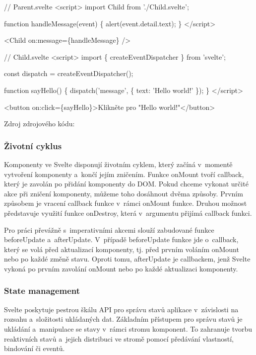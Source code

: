 \begin{prog}
// Parent.svelte
<script>
  import Child from './Child.svelte';

  function handleMessage(event) \{
    alert(event.detail.text);
  \}
</script>

<Child on:message=\{handleMessage\} />

// Child.svelte
<script>
  import \{ createEventDispatcher \} from 'svelte';

  const dispatch = createEventDispatcher();

  function sayHello() \{
    dispatch('message', \{
      text: 'Hello world!'
    \});
  \}
</script>

<button on:click=\{sayHello\}>Klikněte pro "Hello world!"</button>
\end{prog}

Zdroj zdrojového kódu: \cite{svelte}

\subsubsection{Životní cyklus}

Komponenty ve Svelte disponují životním cyklem, který začíná v~momentě vytvoření komponenty a~končí jejím zničením. 
Funkce onMount tvoří callback, který je zavolán po přidání komponenty do DOM. Pokud chceme vykonat určité akce při zničení komponenty, můžeme toho dosáhnout dvěma způsoby. 
Prvním způsobem je vracení callback funkce v~rámci onMount funkce. Druhou možnost představuje využití funkce onDestroy, která v~argumentu přijímá callback funkci. 

Pro práci převážně s~imperativními akcemi slouží zabudované funkce beforeUpdate a~afterUpdate. 
V~případě beforeUpdate funkce jde o~callback, který se volá před aktualizací komponenty, tj. před prvním voláním onMount nebo po každé změně stavu. 
Oproti tomu, afterUpdate je callbackem, jenž Svelte vykoná po prvním zavolání onMount nebo po každé aktualizaci komponenty.\cite{sveltehandbook,svelte}

\subsubsection{State management}

Svelte poskytuje pestrou škálu API pro správu stavů aplikace v~závislosti na rozsahu a~složitosti ukládaných dat. 
Základním přístupem pro správu stavů je ukládání a~manipulace se stavy v~rámci stromu komponent. 
To zahranuje tvorbu reaktivních stavů a~jejich distribuci ve stromě pomocí předávání vlastností, bindování či eventů. 


